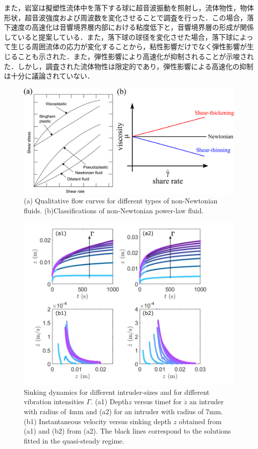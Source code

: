 また，岩室\cite{ref:8}は擬塑性流体中を落下する球に超音波振動を照射し，流体物性，物体形状，超音波強度および周波数を変化させることで調査を行った．この場合，落下速度の高速化は音響境界層内部における粘度低下と，音響境界層の形成が関係していると提案している．また，落下球の球径を変化させた場合，落下球によって生じる周囲流体の応力が変化することから，粘性影響だけでなく弾性影響が生じることも示された．また，弾性影響により高速化が抑制されることが示唆された．しかし，調査された流体物性は限定的であり，弾性影響による高速化の抑制は十分に議論されていない．
\begin{figure}[ht]
    \centering
    \includegraphics[width=1\textwidth]{1-Background/shea-thining.eps}
    \caption{(a) Qualitative flow curves for different types of non-Newtonian fluids\cite{ref:1}. (b)Classifications of non-Newtonian power-law fluid.}
    \label{fig:1-fluid-curve}
\end{figure}
\begin{figure}[ht]
    \begin{center}
        \includegraphics[width=12.0cm,clip]{1-Background/4-sinking.png}
        \caption{Sinking dynamics for different intruder-sizes and for different vibration intensities $\Gamma$. (a1) Depth$z$ versus time$t$ for $\dot{z}$ an intruder with radius of 4mm and (a2) for an intruder with radius of 7mm. (b1) Instantaneous velocity versus sinking depth $z$ obtained from (a1) and (b2) from (a2). The black lines correspond to the solutions fitted in the quasi-steady regime\cite{ref:6}.}
        \label{fig:4-sinking}
    \end{center}
\end{figure}
\newpage
